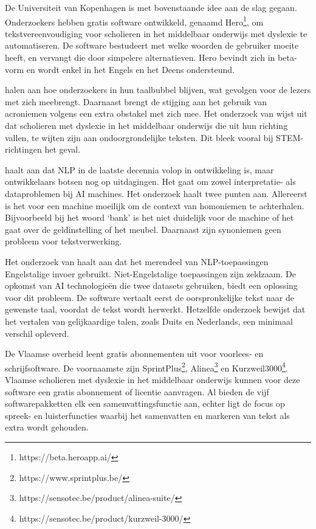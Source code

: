 De Universiteit van Kopenhagen is met bovenstaande idee aan de slag gegaan. Onderzoekers \textcite{Bingel2018} hebben gratis software ontwikkeld, genaamd Hero\footnote{https://beta.heroapp.ai/}, om tekstvereenvoudiging voor scholieren in het middelbaar onderwijs met dyslexie te automatiseren. De software bestudeert met welke woorden de gebruiker moeite heeft, en vervangt die door simpelere alternatieven. Hero bevindt zich in beta-vorm en wordt enkel in het Engels en het Deens ondersteund. 

\textcite{PlavenSigray2017} halen aan hoe onderzoekers in hun taalbubbel blijven, wat gevolgen voor de lezers met zich meebrengt. Daarnaast brengt de stijging aan het gebruik van acroniemen volgens \textcite{Barnett2020} een extra obstakel met zich mee. Het onderzoek van \textcite{Donato2022} wijst uit dat scholieren met dyslexie in het middelbaar onderwijs die uit hun richting vallen, te wijten zijn aan ondoorgrondelijke teksten. Dit bleek vooral bij STEM-richtingen het geval. 

\textcite{Roldos2020} haalt aan dat NLP in de laatste decennia volop in ontwikkeling is, maar ontwikkelaars botsen nog op uitdagingen. Het gaat om zowel interpretatie- als dataproblemen bij AI machines. Het onderzoek haalt twee punten aan. Allereerst is het voor een machine moeilijk om de context van homoniemen te achterhalen. Bijvoorbeeld bij het woord ‘bank’ is het niet duidelijk voor de machine of het gaat over de geldinstelling of het meubel. Daarnaast zijn synoniemen geen probleem voor tekstverwerking.

Het onderzoek van \textcite{Sciforce2020} haalt aan dat het merendeel van NLP-toepassingen Engelstalige invoer gebruikt. Niet-Engelstalige toepassingen zijn zeldzaam. De opkomst van AI technologieën die twee datasets gebruiken, biedt een oplossing voor dit probleem. De software vertaalt eerst de oorspronkelijke tekst naar de gewenste taal, voordat de tekst wordt herwerkt. Hetzelfde onderzoek bewijst dat het vertalen van gelijkaardige talen, zoals Duits en Nederlands, een minimaal verschil opleverd.

De Vlaamse overheid leent gratis abonnementen uit voor voorlees- en schrijfsoftware. De voornaamste zijn SprintPlus\footnote{https://www.sprintplus.be/}, Alinea\footnote{https://sensotec.be/product/alinea-suite/} en Kurzweil3000\footnote{https://sensotec.be/product/kurzweil-3000/}. Vlaamse scholieren met dyslexie in het middelbaar onderwijs kunnen voor deze software een gratis abonnement of licentie aanvragen. Al bieden de vijf softwarepakketten elk een samenvattingsfunctie aan, echter ligt de focus op spreek- en luisterfuncties waarbij het samenvatten en markeren van tekst als extra wordt gehouden.

